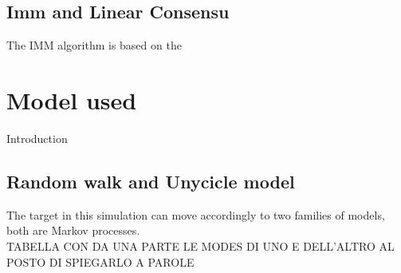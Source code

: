 \documentclass{article}
\begin{document}
\begin{multicols}{2}
    \subsection*{Imm and Linear Consensu}
    The IMM algorithm is based on the

    \section*{Model used}
    Introduction

    \subsection*{Random walk and Unycicle model}
    The target in this simulation can move accordingly to two families of models, both are Markov processes.
    \\
    TABELLA CON DA UNA PARTE LE MODES DI UNO E DELL'ALTRO AL POSTO DI SPIEGARLO A PAROLE
    \\
    

\end{multicols}
\end{document}
